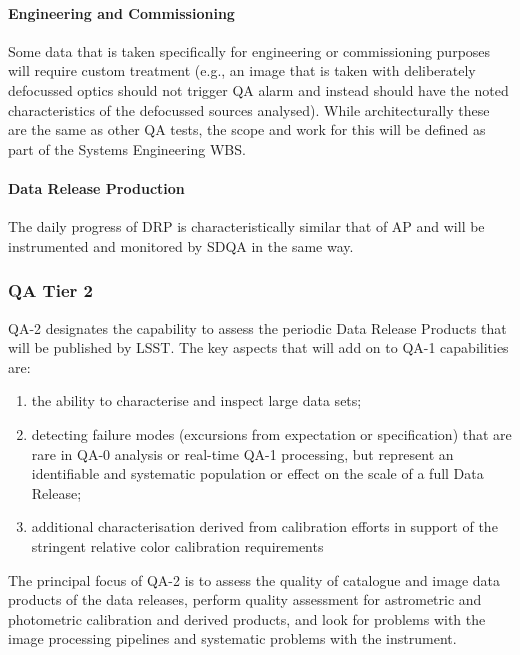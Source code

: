 \paragraph{Engineering and Commissioning}

Some data that is taken specifically for engineering or commissioning purposes will require custom treatment (e.g., an image that is taken with deliberately defocussed optics should not trigger QA alarm and instead should have the noted characteristics of the defocussed sources analysed). While architecturally these are the same as other QA tests, the scope and work for this will be defined as part of the Systems Engineering WBS.

\paragraph{Data Release Production}

The daily progress of DRP is characteristically similar that of AP and will be instrumented and monitored by SDQA in the same way.

\subsubsection{QA Tier 2}

QA-2 designates the capability to assess the periodic Data Release Products that will be published by LSST.  The key aspects that will add on to QA-1 capabilities are:

\begin{enumerate}

\item the ability to characterise and inspect large data sets; 

\item detecting failure modes (excursions from expectation or specification) that are rare in QA-0 analysis or real-time QA-1 processing, but represent an identifiable and systematic population or effect on the scale of a full Data Release; 

\item additional characterisation derived from calibration efforts in support of the stringent relative color calibration requirements

\end{enumerate}

The principal focus of QA-2 is to assess the quality of catalogue and image data products of the data releases, perform quality assessment for astrometric and photometric calibration and derived products, and look for problems with the image processing pipelines and systematic problems with the instrument.

